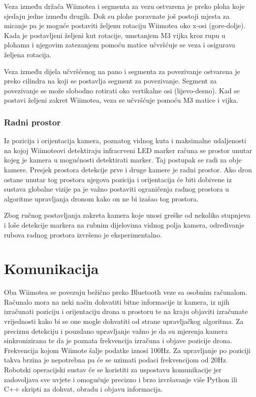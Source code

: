 \documentclass[times, utf8, diplomski]{fer}
\begin{document}
Veza između držača Wiimotea i segmenta za vezu ostvarena je preko ploha koje sjedaju jedne između drugih. Dok su plohe poravnate još postoji mjesta za micanje pa je moguće postaviti željenu rotaciju Wiimotea oko x-osi (gore-dolje). Kada je postavljeni željeni kut rotacije, umetanjem M3 vijka kroz rupu u plohama i njegovim zatezanjem pomoću matice učvršćuje se veza i osigurava željena rotacija.

Veza između dijela učvršćenog na pano i segmenta za povezivanje ostvarena je preko cilindra na koji se postavlja segment za povezivanje. Segment za povezivanje se može slobodno rotirati oko vertikalne osi (lijevo-desno). Kad se postavi željeni zakret Wiimotea, veza se učvršćuje pomoću M3 matice i vijka. 

\subsection{Radni prostor}
Iz pozicija i orijentacija kamera, poznatog vidnog kuta i maksimalne udaljenosti na kojoj Wiimoteovi detektiraju infracrveni LED marker računa se prostor unutar kojeg je kamera u mogućnosti detektirati marker. Taj postupak se radi za obje kamere. Presjek prostora detekcije prve i druge kamere je radni prostor. Ako dron ostane unutar tog prostora njegova pozicija i orijentacija će biti dobivene iz sustava globalne vizije pa je važno postaviti ograničenja radnog prostora u algoritme upravljanja dronom kako on ne bi izašao tog prostora.

Zbog ručnog postavljanja zakreta kamera koje unosi greške od nekoliko stupnjeva i loše detekcije markera na rubnim dijelovima vidnog polja kamera, određivanje rubova radnog prostora izvršeno je eksperimentalno.  

\chapter{Komunikacija}
Oba Wiimotea se povezuju bežično preko Bluetooth veze sa osobnim računalom. Računalo mora na neki način dohvatiti bitne informacije iz kamera, iz njih izračunati poziciju i orijentaciju drona u prostoru te na kraju objaviti izračunate vrijednosti kako bi se one mogle dohvatiti od strane upravljačkog algoritma. Za preciznu detekciju i pouzdano upravljanje važno je da su mjerenja kamera sinkronizirana te da je poznata frekvencija izračuna i objave pozicije drona. Frekvencija kojom Wiimote šalje podatke iznosi 100Hz. Za upravljanje po poziciji takva brzina je nepotrebna pa će se uzimati podaci frekvencijom od 20Hz. Robotski operacijski sustav će se koristiti za uspostavu komunikacije jer zadovoljava sve uvjete i omogućuje precizno i brzo izvršavanje više Python ili C++ skripti za dohvat, obradu i objavu informacija.
 
\end{document}
